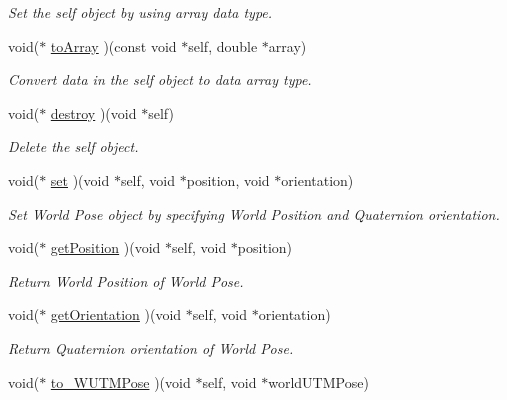 \begin{CompactItemize}
\begin{CompactList}\small\item\em Set the self object by using array data type. \item\end{CompactList}\item 
void($\ast$ \hyperlink{structdrdc__WPose__t_e169ad4485ee2021344b82ee2e2f282b}{toArray} )(const void $\ast$self, double $\ast$array)
\begin{CompactList}\small\item\em Convert data in the self object to data array type. \item\end{CompactList}\item 
void($\ast$ \hyperlink{structdrdc__WPose__t_af1d0b646c10fa92d1710608a9c884be}{destroy} )(void $\ast$self)
\begin{CompactList}\small\item\em Delete the self object. \item\end{CompactList}\item 
void($\ast$ \hyperlink{structdrdc__WPose__t_c92f5aeb84b2e6a64fee507c46142894}{set} )(void $\ast$self, void $\ast$position, void $\ast$orientation)
\begin{CompactList}\small\item\em Set World Pose object by specifying World Position and Quaternion orientation. \item\end{CompactList}\item 
void($\ast$ \hyperlink{structdrdc__WPose__t_c8fe7410e2bc56d75ddf74b1eda30974}{getPosition} )(void $\ast$self, void $\ast$position)
\begin{CompactList}\small\item\em Return World Position of World Pose. \item\end{CompactList}\item 
void($\ast$ \hyperlink{structdrdc__WPose__t_9bf7a8f57cc6eca900b950ba2bc1591a}{getOrientation} )(void $\ast$self, void $\ast$orientation)
\begin{CompactList}\small\item\em Return Quaternion orientation of World Pose. \item\end{CompactList}\item 
void($\ast$ \hyperlink{structdrdc__WPose__t_863289a024c1e98d515f5d2f30cb7e54}{to\_\-WUTMPose} )(void $\ast$self, void $\ast$worldUTMPose)

\end{CompactItemize}
